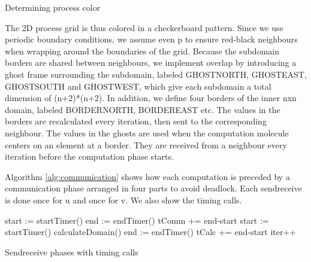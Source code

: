 \documentclass[a4paper,11pt]{article}
\begin{document}
\vspace{0.7 cm}
\begin{algorithm}[H]
\label{alg:processcolor}
  \SetAlgoLined
  \caption{Determining process color}
\end{algorithm}
\vspace{0.7 cm}

The 2D process grid is thus colored in a checkerboard pattern. Since we use periodic boundary conditions, we assume even p to ensure red-black neighbours when wrapping around the boundaries of the grid. Because the subdomain borders are shared between neighbours, we implement overlap by introducing a ghost frame surrounding the subdomain, labeled GHOST\textunderscore NORTH, GHOST\textunderscore EAST, GHOST\textunderscore SOUTH and GHOST\textunderscore WEST, which give each subdomain a total dimension of (n+2)*(n+2). In addition, we define four borders of the inner nxn domain, labeled BORDER\textunderscore NORTH, BORDER\textunderscore EAST etc. The values in the borders are recalculated every iteration, then sent to the corresponding neighbour. The values in the ghosts are used when the computation molecule centers on an element at a border. They are received from a neighbour every iteration before the computation phase starts.

Algorithm \ref{alg:communication} shows how each computation is preceded by a communication phase arranged in four parts to avoid deadlock. Each sendreceive is done once for u and once for v. We also show the timing calls.

\vspace{0.7 cm}
\begin{algorithm}[H]
\label{alg:communication}
  \SetAlgoLined
  {
    start := startTimer()\;
    end := endTimer()\;
    tComm += end-start\;
    \BlankLine
    start := startTimer()\;  
    \BlankLine 
    calculateDomain()\;
    \BlankLine
    end := endTimer()\;
    tCalc += end-start\;
    \BlankLine
    iter++\;
  }
  \caption{Sendreceive phases with timing calls}
\end{algorithm}
\vspace{0.7 cm}
\end{document}
